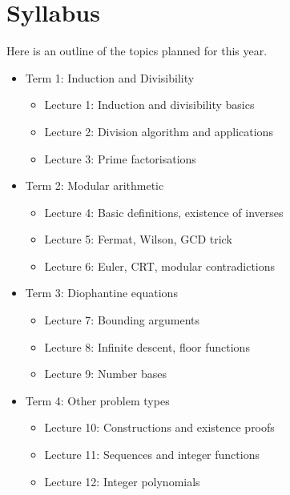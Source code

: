 \documentclass{article}
\begin{document}
\section{Syllabus}
Here is an outline of the topics planned for this year.
\begin{itemize}
	\item Term 1: Induction and Divisibility
	      \begin{itemize}
		      \item Lecture 1: Induction and divisibility basics
		      \item Lecture 2: Division algorithm and applications
		      \item Lecture 3: Prime factorisations
	      \end{itemize}
	\item Term 2: Modular arithmetic
	      \begin{itemize}
		      \item Lecture 4: Basic definitions, existence of inverses
		      \item Lecture 5: Fermat, Wilson, GCD trick
		      \item Lecture 6: Euler, CRT, modular contradictions
	      \end{itemize}
	\item Term 3: Diophantine equations
	      \begin{itemize}
		      \item Lecture 7: Bounding arguments
		      \item Lecture 8: Infinite descent, floor functions
		      \item Lecture 9: Number bases
	      \end{itemize}
	\item Term 4: Other problem types
	      \begin{itemize}
		      \item Lecture 10: Constructions and existence proofs
		      \item Lecture 11: Sequences and integer functions
		      \item Lecture 12: Integer polynomials
	      \end{itemize}
\end{itemize}
\end{document}
